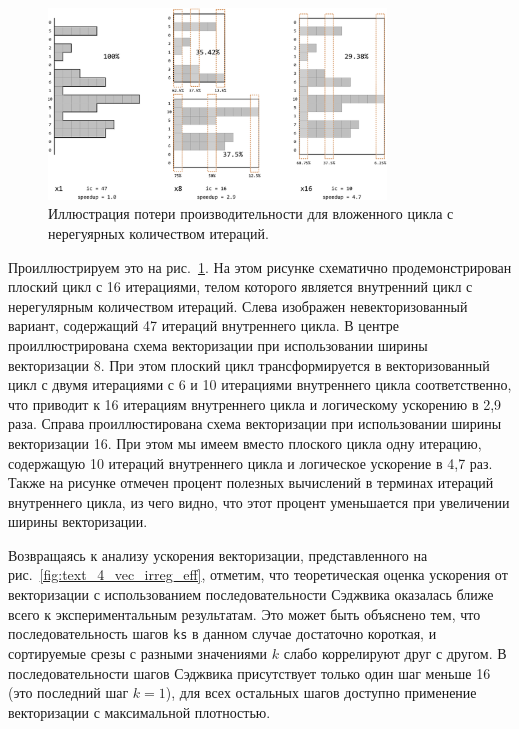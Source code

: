 \begin{figure}[ht]
\centering
\includegraphics[width=0.8\textwidth]{./pics/text_4_vec_irreg/pack.png}
\singlespacing
{}\caption{Иллюстрация потери производительности для вложенного цикла с нерегуярных количеством итераций.}
\label{fig:text_4_vec_irreg_pack}
\end{figure}

Проиллюстрируем это на рис.~\ref{fig:text_4_vec_irreg_pack}.
На этом рисунке схематично продемонстрирован плоский цикл с 16 итерациями, телом которого является внутренний цикл с нерегулярным количеством итераций.
Слева изображен невекторизованный вариант, содержащий 47 итераций внутреннего цикла.
В центре проиллюстрирована схема векторизации при использовании ширины векторизации 8.
При этом плоский цикл трансформируется в векторизованный цикл с двумя итерациями с 6 и 10 итерациями внутреннего цикла соответственно, что приводит к 16 итерациям внутреннего цикла и логическому ускорению в 2,9 раза.
Справа проиллюстирована схема векторизации при использовании ширины векторизации 16.
При этом мы имеем вместо плоского цикла одну итерацию, содержащую 10 итераций внутреннего цикла и логическое ускорение в 4,7 раз.
Также на рисунке отмечен процент полезных вычислений в терминах итераций внутреннего цикла, из чего видно, что этот процент уменьшается при увеличении ширины векторизации.

Возвращаясь к анализу ускорения векторизации, представленного на рис.~\ref{fig:text_4_vec_irreg_eff}, отметим, что теоретическая оценка ускорения от векторизации с использованием последовательности Сэджвика оказалась ближе всего к экспериментальным результатам.
Это может быть объяснено тем, что последовательность шагов \texttt{ks} в данном случае достаточно короткая, и сортируемые срезы с разными значениями $k$ слабо коррелируют друг с другом.
В последовательности шагов Сэджвика присутствует только один шаг меньше 16 (это последний шаг $k = 1$), для всех остальных шагов доступно применение векторизации с максимальной плотностью.

